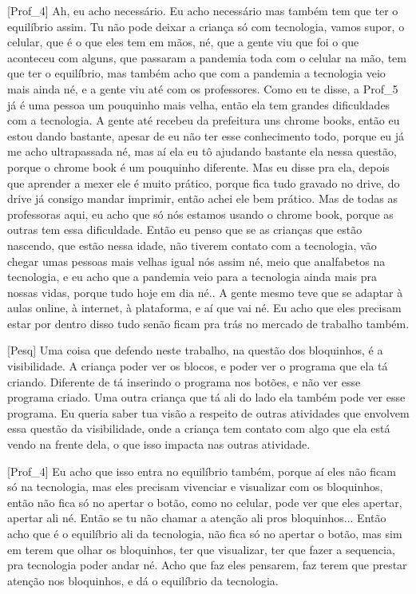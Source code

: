 [Prof\_4] Ah, eu acho necessário. Eu acho necessário mas também tem que ter o equilíbrio assim. Tu não pode deixar a criança só com tecnologia, vamos supor, o celular, que é o que eles tem em mãos, né, que a gente viu que foi o que aconteceu com alguns, que passaram a pandemia toda com o celular na mão, tem que ter o equilíbrio, mas também acho que com a pandemia a tecnologia veio mais ainda né, e a gente viu até com os professores. Como eu te disse, a Prof\_5 já é uma pessoa um pouquinho mais velha, então ela tem grandes dificuldades com a tecnologia. A gente até recebeu da prefeitura uns chrome books, então eu estou dando bastante, apesar de eu não ter esse conhecimento todo, porque eu já me acho ultrapassada né, mas aí ela eu tô ajudando bastante ela nessa questão, porque o chrome book é um pouquinho diferente. Mas eu disse pra ela, depois que aprender a mexer ele é muito prático, porque fica tudo gravado no drive, do drive já consigo mandar imprimir, então achei ele bem prático. Mas de todas as professoras aqui, eu acho que só nós estamos usando o chrome book, porque as outras tem essa dificuldade. Então eu penso que se as crianças que estão nascendo, que estão nessa idade, não tiverem contato com a tecnologia, vão chegar umas pessoas mais velhas igual nós assim né, meio que analfabetos na tecnologia, e eu acho que a pandemia veio para a tecnologia ainda mais pra nossas vidas, porque tudo hoje em dia né.. A gente mesmo teve que se adaptar à aulas online, à internet, à plataforma, e aí que vai né. Eu acho que eles precisam estar por dentro disso tudo senão ficam pra trás no mercado de trabalho também.

[Pesq] Uma coisa que defendo neste trabalho, na questão dos bloquinhos, é a visibilidade. A criança poder ver os blocos, e poder ver o programa que ela tá criando. Diferente de tá inserindo o programa nos botões, e não ver esse programa criado. Uma outra criança que tá ali do lado ela também pode ver esse programa. Eu queria saber tua visão a respeito de outras atividades que envolvem essa questão da visibilidade, onde a criança tem contato com algo que ela está vendo na frente dela, o que isso impacta nas outras atividade.

[Prof\_4] Eu acho que isso entra no equilíbrio também, porque aí eles não ficam só na tecnologia, mas eles precisam vivenciar e visualizar com os bloquinhos, então não fica só no apertar o botão, como no celular, pode ver que eles apertar, apertar ali né. Então se tu não chamar a atenção ali pros bloquinhos... Então acho que é o equilíbrio ali da tecnologia, não fica só no apertar o botão, mas sim em terem que olhar os bloquinhos, ter que visualizar, ter que fazer a sequencia, pra tecnologia poder andar né. Acho que faz eles pensarem, faz terem que prestar atenção nos bloquinhos, e dá o equilíbrio da tecnologia.

